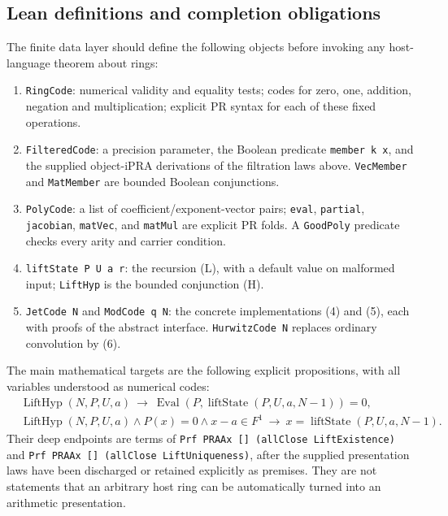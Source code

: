 \subsection{Lean definitions and completion obligations}

The finite data layer should define the following objects before invoking
any host-language theorem about rings:
\begin{enumerate}
\item \texttt{RingCode}: numerical validity and equality tests; codes for
zero, one, addition, negation and multiplication; explicit PR syntax for
each of these fixed operations.
\item \texttt{FilteredCode}: a precision parameter, the Boolean predicate
\texttt{member k x}, and the supplied object-iPRA derivations of the
filtration laws above.  \texttt{VecMember} and \texttt{MatMember} are
bounded Boolean conjunctions.
\item \texttt{PolyCode}: a list of coefficient/exponent-vector pairs;
\texttt{eval}, \texttt{partial}, \texttt{jacobian},
\texttt{matVec}, and \texttt{matMul} are explicit PR folds.  A
\texttt{GoodPoly} predicate checks every arity and carrier condition.
\item \texttt{liftState P U a r}: the recursion (L), with a default value
on malformed input; \texttt{LiftHyp} is the bounded conjunction (H).
\item \texttt{JetCode N} and \texttt{ModCode q N}: the concrete
implementations (4) and (5), each with proofs of the abstract interface.
\texttt{HurwitzCode N} replaces ordinary convolution by (6).
\end{enumerate}

The main mathematical targets are the following explicit propositions,
with all variables understood as numerical codes:
\begin{align*}
 &\operatorname{LiftHyp}(N,P,U,a)\ \longrightarrow\
   \operatorname{Eval}(P,\operatorname{liftState}(P,U,a,N-1))=0,\\
 &\operatorname{LiftHyp}(N,P,U,a)\wedge P(x)=0\wedge x-a\in F^1
      \ \longrightarrow\
   x=\operatorname{liftState}(P,U,a,N-1).
\end{align*}
Their deep endpoints are terms of
\texttt{Prf PRAAx [] (allClose LiftExistence)} and
\texttt{Prf PRAAx [] (allClose LiftUniqueness)}, after the supplied
presentation laws have been discharged or retained explicitly as premises.
They are not statements that an arbitrary host ring can be automatically
turned into an arithmetic presentation.

